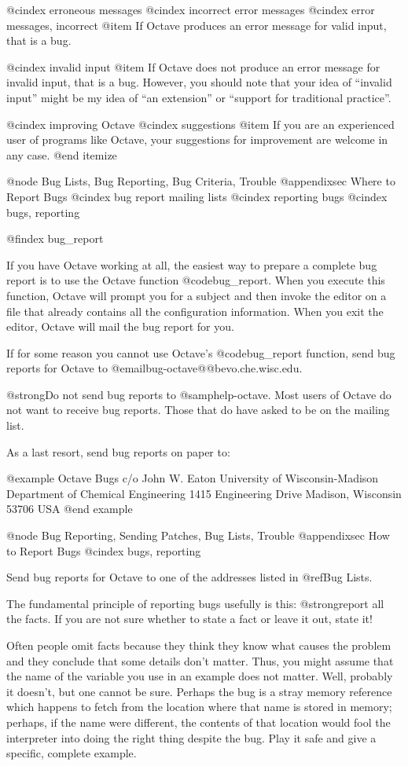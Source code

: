 @cindex erroneous messages
@cindex incorrect error messages
@cindex error messages, incorrect
@item
If Octave produces an error message for valid input, that is a bug.

@cindex invalid input
@item
If Octave does not produce an error message for invalid input, that is
a bug.  However, you should note that your idea of ``invalid input''
might be my idea of ``an extension'' or ``support for traditional
practice''.

@cindex improving Octave
@cindex suggestions
@item
If you are an experienced user of programs like Octave, your suggestions
for improvement are welcome in any case.
@end itemize

@node Bug Lists, Bug Reporting, Bug Criteria, Trouble
@appendixsec Where to Report Bugs
@cindex bug report mailing lists
@cindex reporting bugs
@cindex bugs, reporting

@findex bug_report

If you have Octave working at all, the easiest way to prepare a complete
bug report is to use the Octave function @code{bug_report}.  When you
execute this function, Octave will prompt you for a subject and then
invoke the editor on a file that already contains all the configuration
information.  When you exit the editor, Octave will mail the bug report
for you.

If for some reason you cannot use Octave's @code{bug_report} function,
send bug reports for Octave to @email{bug-octave@@bevo.che.wisc.edu}.

@strong{Do not send bug reports to @samp{help-octave}}.  Most users of
Octave do not want to receive bug reports.  Those that do have asked to
be on the mailing list.

As a last resort, send bug reports on paper to:

@example
Octave Bugs c/o John W. Eaton
University of Wisconsin-Madison
Department of Chemical Engineering
1415 Engineering Drive
Madison, Wisconsin 53706  USA
@end example

@node Bug Reporting, Sending Patches, Bug Lists, Trouble
@appendixsec How to Report Bugs
@cindex bugs, reporting

Send bug reports for Octave to one of the addresses listed in
@ref{Bug Lists}.

The fundamental principle of reporting bugs usefully is this:
@strong{report all the facts}.  If you are not sure whether to state a
fact or leave it out, state it!

Often people omit facts because they think they know what causes the
problem and they conclude that some details don't matter.  Thus, you might
assume that the name of the variable you use in an example does not matter.
Well, probably it doesn't, but one cannot be sure.  Perhaps the bug is a
stray memory reference which happens to fetch from the location where that
name is stored in memory; perhaps, if the name were different, the contents
of that location would fool the interpreter into doing the right thing
despite the bug.  Play it safe and give a specific, complete example.

